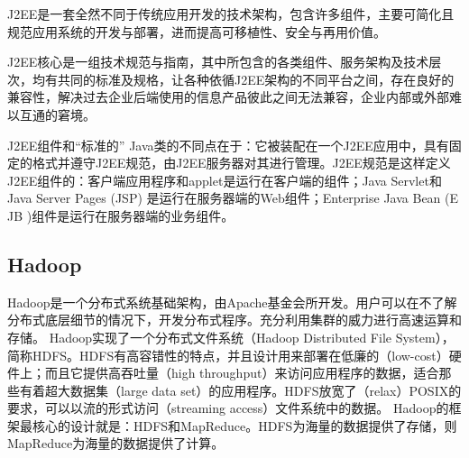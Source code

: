 J2EE是一套全然不同于传统应用开发的技术架构，包含许多组件，主要可简化且规范应用系统的开发与部署，进而提高可移植性、安全与再用价值。

J2EE核心是一组技术规范与指南，其中所包含的各类组件、服务架构及技术层次，均有共同的标准及规格，让各种依循J2EE架构的不同平台之间，存在良好的兼容性，解决过去企业后端使用的信息产品彼此之间无法兼容，企业内部或外部难以互通的窘境。

J2EE组件和“标准的” Java类的不同点在于：它被装配在一个J2EE应用中，具有固定的格式并遵守J2EE规范，由J2EE服务器对其进行管理。J2EE规范是这样定义J2EE组件的：客户端应用程序和applet是运行在客户端的组件；Java Servlet和Java Server Pages (JSP) 是运行在服务器端的Web组件；Enterprise Java Bean (E JB )组件是运行在服务器端的业务组件。

\subsection{Hadoop}
Hadoop是一个分布式系统基础架构，由Apache基金会所开发。用户可以在不了解分布式底层细节的情况下，开发分布式程序。充分利用集群的威力进行高速运算和存储。
Hadoop实现了一个分布式文件系统（Hadoop Distributed File System），简称HDFS。HDFS有高容错性的特点，并且设计用来部署在低廉的（low-cost）硬件上；而且它提供高吞吐量（high throughput）来访问应用程序的数据，适合那些有着超大数据集（large data set）的应用程序。HDFS放宽了（relax）POSIX的要求，可以以流的形式访问（streaming access）文件系统中的数据。
Hadoop的框架最核心的设计就是：HDFS和MapReduce。HDFS为海量的数据提供了存储，则MapReduce为海量的数据提供了计算。





